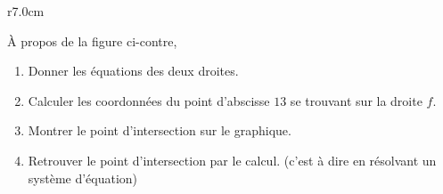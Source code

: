 
\begin{exercice}\label{exosmath-0229}

\begin{wrapfigure}{r}{7.0cm}
            \vspace{-3cm}        %
                \centering
                    
                \end{wrapfigure}

        À propos de la figure ci-contre, 
        \begin{enumerate}
            \item
                Donner les équations des deux droites.
            \item
                Calculer les coordonnées du point d'abscisse \( 13\) se trouvant sur la droite \( f\).
            \item
                Montrer le point d'intersection sur le graphique.
            \item
                Retrouver le point d'intersection par le calcul. (c'est à dire en résolvant un système d'équation)
        \end{enumerate}

\end{exercice}
